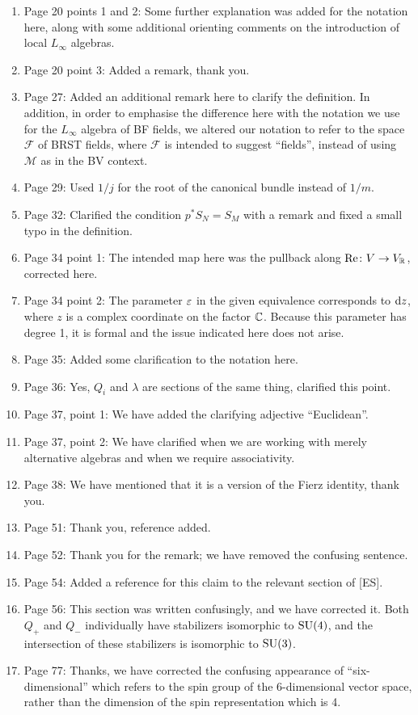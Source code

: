 \documentclass[10pt, oneside]{article}
\begin{document}
\begin{enumerate}
 \item Page 20 points 1 and 2: Some further explanation was added for the notation here, along with some additional orienting comments on the introduction of local $L_\infty$ algebras.
 \item Page 20 point 3: Added a remark, thank you.
 \item Page 27: Added an additional remark here to clarify the definition.  In addition, in order to emphasise the difference here with the notation we use for the $L_\infty$ algebra of BF fields, we altered our notation to refer to the space $\mathcal F$ of BRST fields, where $\mathcal F$ is intended to suggest ``fields'', instead of using $\mathcal M$ as in the BV context. \item Page 29: Used $1/j$ for the root of the canonical bundle instead of $1/m$.
 \item Page 32: Clarified the condition $p^*S_N = S_M$ with a remark and fixed a small typo in the definition.
 \item Page 34 point 1: The intended map here was the pullback along $\mathrm{Re} \colon V \to V_\mathbb R$, corrected here.
 \item Page 34 point 2: The parameter $\varepsilon$ in the given equivalence corresponds to ${\rm d} z$, where $z$ is a complex coordinate on the factor $\mathbb C$.  Because this parameter has degree 1, it is formal and the issue indicated here does not arise.
 \item Page 35: Added some clarification to the notation here.
 \item Page 36: Yes, $Q_i$ and $\lambda$ are sections of the same thing, clarified this point. 
 \item Page 37, point 1: We have added the clarifying adjective ``Euclidean''.
 \item Page 37, point 2: We have clarified when we are working with merely alternative algebras and when we require associativity.
 \item Page 38: We have mentioned that it is a version of the Fierz identity, thank you.
 \item Page 51: Thank you, reference added.
 \item Page 52: Thank you for the remark; we have removed the confusing sentence.
 \item Page 54: Added a reference for this claim to the relevant section of [ES].
 \item Page 56: This section was written confusingly, and we have corrected it.  Both $Q_+$ and $Q_-$ individually have stabilizers isomorphic to $\mathrm{SU}(4)$, and the intersection of these stabilizers is isomorphic to $\mathrm{SU}(3)$.
 \item Page 77: Thanks, we have corrected the confusing appearance of ``six-dimensional'' which refers to the spin group of the 6-dimensional vector space, rather than the dimension of the spin representation which is 4.
\end{enumerate}

 
\end{document}
